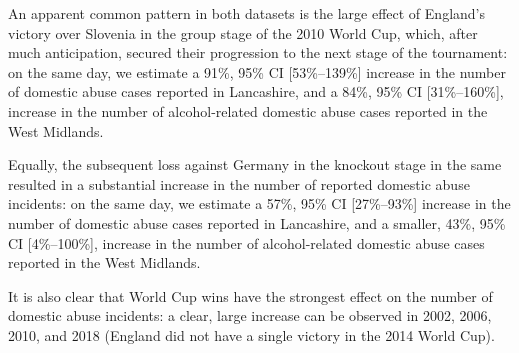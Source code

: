 \documentclass[12pt, a4paper]{article}
\begin{document}
An apparent common pattern in both datasets is the large effect of England's victory over Slovenia in the group stage of the 2010 World Cup, which, after much anticipation, secured their progression to the next stage of the tournament: on the same day, we estimate a 91\%, 95\% CI [53\%--139\%] increase in the number of domestic abuse cases reported in Lancashire, and a 84\%, 95\% CI [31\%--160\%], increase in the number of alcohol-related domestic abuse cases reported in the West Midlands. 

Equally, the subsequent loss against Germany in the knockout stage in the same resulted in a substantial increase in the number of reported domestic abuse incidents: on the same day, we estimate a 57\%, 95\% CI [27\%--93\%] increase in the number of domestic abuse cases reported in Lancashire, and a smaller, 43\%, 95\% CI [4\%--100\%], increase in the number of alcohol-related domestic abuse cases reported in the West Midlands.



   
  It is also clear that World Cup wins have the strongest effect on the number of domestic abuse incidents: a clear, large increase can be observed in 2002, 2006, 2010, and 2018 (England did not have a single victory in the 2014 World Cup).
 

\end{document}
